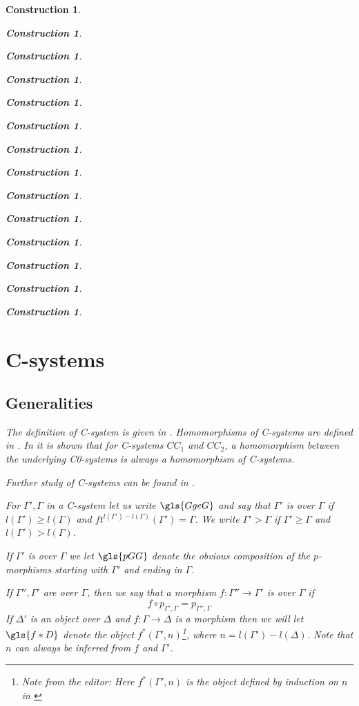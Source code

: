 \documentclass[onecolumn,12pt]{amsart}
\numberwithin{proposition}{subsection}
\newtheorem{construction}[proposition]{Construction}
\newcommand{\sr}{\rightarrow}
\newcommand{\editorfootnote}[1]{\footnote{Note from the editor: #1}}
\begin{document}
\begin{construction}
\begin{construction}
\begin{construction}
\begin{construction}
\begin{construction}
\begin{construction}
\begin{construction}
\begin{construction}
\begin{construction}
\begin{construction}
\begin{construction}
\begin{construction}
\begin{construction}
\begin{construction}
\section{C-systems}\label{C-systems}

\subsection{Generalities}
\label{onCsystems}
%
The definition of \emph{C-system} is given in \cite[Def. 2.1,
  2.3]{Csubsystems}.  \emph{Homomorphisms} of C-systems are defined in \cite[Def. 3.1,
  p 1188]{Cfromauniverse}. In \cite[Lemma 3.4, p.~1190]{Cfromauniverse} it is
shown that for C-systems $CC_1$ and $CC_2$, a homomorphism between the underlying
C0-systems is always a homomorphism of C-systems.

Further study of C-systems can be found in \cite[Sec. 2, pp. 1048-1064]{fromunivwithPiI}. 

For $\Gamma',\Gamma$ in a C-system let us write $\gls{GgeG}$ and say
that $\Gamma'$ is \emph{over} $\Gamma$ if $l(\Gamma')\ge l(\Gamma)$ and
$ft^{l(\Gamma')-l(\Gamma)}(\Gamma')=\Gamma$. We write $\Gamma'>\Gamma$ if
$\Gamma'\ge \Gamma$ and $l(\Gamma')>l(\Gamma)$.

If $\Gamma'$ is over $\Gamma$ we let $\gls{pGG}$ denote the
obvious composition of the $p$-morphisms starting with $\Gamma'$ and ending in
$\Gamma$.

If $\Gamma'',\Gamma'$ are over $\Gamma$, then we say that a morphism
$f:\Gamma''\sr \Gamma'$ is \emph{over} $\Gamma$  if
%
$$f\circ p_{\Gamma',\Gamma}=p_{\Gamma'',\Gamma}$$
%
If $\Delta'$ is an object over $\Delta$ and $f:\Gamma\sr \Delta$ is a morphism
then we will let $\gls{f*D}$ denote the object $f^*(\Gamma',n)$\editorfootnote{Here $f^*(\Gamma',n)$
 is the object defined by induction on $n$ in \cite[section 3]{Csubsystems}}, where
$n=l(\Gamma')-l(\Delta)$. Note that $n$ can always be inferred from $f$ and
$\Gamma'$.


\end{construction}
\end{construction}
\end{construction}
\end{construction}
\end{construction}
\end{construction}
\end{construction}
\end{construction}
\end{construction}
\end{construction}
\end{construction}
\end{construction}
\end{construction}
\end{construction}
\end{document}
